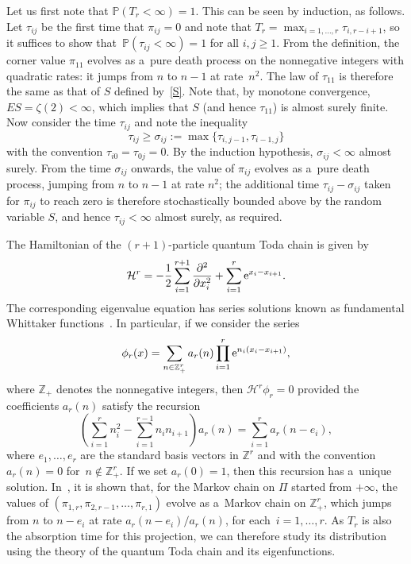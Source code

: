 \documentclass[pdftex]{sigma}
\theoremstyle{definition}
\newcommand\Z{{\mathbb Z}}
\renewcommand\H{{\mathcal H}}
\renewcommand\P{{\mathbb P}}
\begin{document}
Let us first note that $\P(T_r<\infty)=1$. This can be seen by induction, as follows.
Let $\tau_{ij}$ be the first time that $\pi_{ij}=0$ and note that $T_r=\max_{i=1,\dots,r}\tau_{i,r-i+1}$,
so it suffices to show that~${\P(\tau_{ij}<\infty)=1}$ for all $i,j\ge 1$.
From the definition, the corner value $\pi_{11}$ evolves as a~pure death process
on the nonnegative integers with quadratic rates: it jumps from $n$ to $n-1$ at rate~$n^2$.
The law of $\tau_{11}$ is therefore the same as that of $S$ defined by~\eqref{S}.
Note that, by monotone convergence, $ES=\zeta(2)<\infty$, which implies that $S$ (and hence $\tau_{11}$)
is almost surely finite. Now consider the time $\tau_{ij}$ and note the inequality
\[\tau_{ij}\ge \sigma_{ij}:=\max\{ \tau_{i,j-1},\tau_{i-1,j}\}\]
with the convention $\tau_{i0}=\tau_{0j}=0$.
By the induction hypothesis, $\sigma_{ij}<\infty$ almost surely.
From the time $\sigma_{ij}$ onwards, the value of $\pi_{ij}$ evolves as a~pure death process, jumping from
$n$ to $n-1$ at rate $n^2$; the additional time $\tau_{ij}-\sigma_{ij}$ taken for $\pi_{ij}$ to reach zero is therefore stochastically bounded above by the random variable $S$, and hence $\tau_{ij}<\infty$ almost surely, as required.

The Hamiltonian of the $(r+1)$-particle quantum Toda chain is given by
\[\H^r = -\frac12 \sum_{i=1}^{r+1} \frac{\partial^2}{\partial x_i^2} + \sum_{i=1}^{r}{\rm e}^{x_i-x_{i+1}}.\]
The corresponding eigenvalue equation has series solutions known as
fundamental Whittaker functions~\cite{h,is}.
In particular, if we consider the series
\[
\phi_r(x)=\sum_{n\in\Z_+^r} a_r(n) \prod_{i=1}^r {\rm e}^{n_i(x_i-x_{i+1})}, \]
where $\Z_+$ denotes the nonnegative integers,
then $\H^r\phi_r=0$ provided the coefficients $a_r(n)$ satisfy the recursion
\begin{equation}\label{rec-ar}
\left(\sum_{i=1}^r n_i^2 - \sum_{i=1}^{r-1} n_i n_{i+1}\right) a_r(n) = \sum_{i=1}^r a_r(n-e_i),
\end{equation}
where $e_1,\dots,e_r$ are the standard basis vectors in $\Z^r$ and
with the convention $a_r(n)=0$ for~${n\notin\Z_+^r}$.
If we set $a_r(0)=1$, then this recursion has a~unique solution.
In~\cite{noc23}, it is shown that, for the Markov chain on $\Pi$ started from $+\infty$,
the values of $(\pi_{1,r},\pi_{2,r-1},\dots,\pi_{r,1})$ evolve as a~Markov chain on $\Z_+^r$,
which jumps from $n$ to $n-e_i$ at rate $a_r(n-e_i)/a_r(n)$, for each~${i=1,\dots,r}$.
As $T_r$ is also the absorption time for this projection, we can therefore study its distribution
using the theory of the quantum Toda chain and its eigenfunctions.
\end{document}
